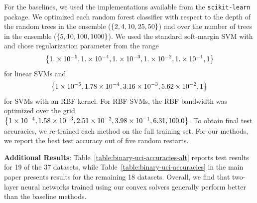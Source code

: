 For the baselines, we used the implementations available from
the \texttt{scikit-learn} package.
We optimized each random forest classifier with respect to the depth of
the random trees in the ensemble (\( \left\{2, 4, 10, 25, 50\right\}\))
and over the number of trees in the ensemble (\( \left\{5, 10, 100, 1000\right\} \)).
We used the standard soft-margin SVM with and chose regularization parameter from
the range
\[
    \left\{1.\times 10^{-5}, 1.\times 10^{-4}, 1.\times 10^{-3}, 1.\times 10^{-2}, 1.\times 10^{-1}, 1\right\}
\]
for linear SVMs and
\[
    \left\{1\times 10^{-5}, 1.78\times 10^{-4}, 3.16\times 10^{-3}, 5.62\times 10^{-2}, 1\right\}
\]
for SVMs with an RBF kernel.
For RBF SVMs, the RBF bandwidth was optimized over the grid \( \left\{1\times 10^{-4},
    1.58\times 10^{-3},
    2.51\times 10^{-2},
    3.98\times 10^{-1},
    6.31,
    100.0\right\} \).
To obtain final test accuracies, we re-trained each method on the full training
set.
For our methods, we report the best test accuracy out of five random restarts.



\textbf{Additional Results}:
Table~\ref{table:binary-uci-accuracies-alt} reports test results for
19 of the 37 datasets, while Table~\ref{table:binary-uci-accuracies} in the
main paper presents results for the remaining 18 datasets.
Overall, we find that two-layer neural networks trained using our convex
solvers generally perform better than the baseline methods.
